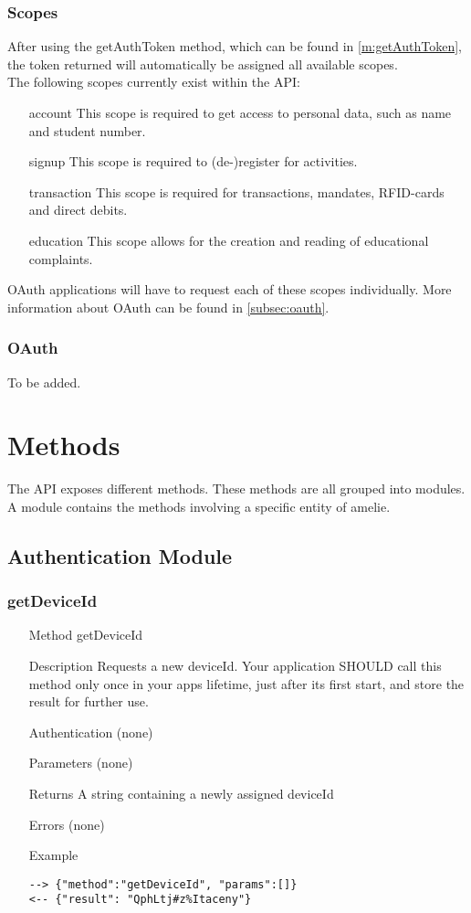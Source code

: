 \documentclass[a4paper]{scrreprt}
\begin{document}
\subsection{Scopes}
After using the getAuthToken method, which can be found in \autoref{m:getAuthToken}, the token returned will automatically be assigned all available scopes.\\
The following scopes currently exist within the API:
\begin{enumerate}
\item[account] This scope is required to get access to personal data, such as name and student number.
\item[signup] This scope is required to (de-)register for activities.
\item[transaction] This scope is required for transactions, mandates, RFID-cards and direct debits.
\item[education] This scope allows for the creation and reading of educational complaints.
\end{enumerate}
OAuth applications will have to request each of these scopes individually. More information about OAuth can be found in \autoref{subsec:oauth}.

\subsection{OAuth}\label{subsec:oauth}
To be added.

\chapter{Methods}
The API exposes different methods. These methods are all grouped into modules. A module contains the methods involving a specific entity of amelie.

\section{Authentication Module}\label{sec:authmodule}
\subsection{getDeviceId}\label{m:getDeviceId}
\begin{enumerate}
\item[Method] getDeviceId
\item[Description] Requests a new deviceId. Your application SHOULD call this method only once in your apps lifetime, just after its first start, and store the result for further use.
\item[Authentication] (none)
\item[Parameters] (none)
\item[Returns] A string containing a newly assigned deviceId
\item[Errors] (none)
\item[Example]
\begin{lstlisting}
--> {"method":"getDeviceId", "params":[]}
<-- {"result": "QphLtj#z%Itaceny"}
\end{lstlisting}
\end{enumerate}
\end{document}
